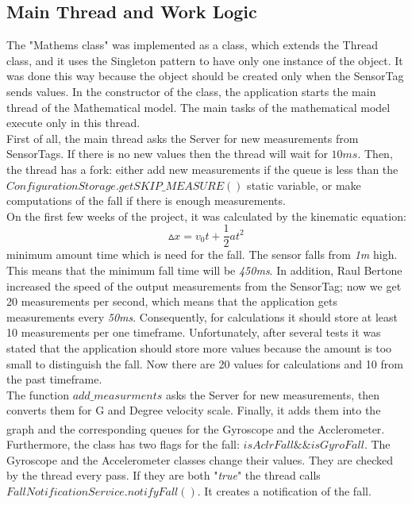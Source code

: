 \documentclass[hidelinks,conference,12pt]{IEEETran}
\begin{document}
\subsection{Main Thread and Work Logic}
The "Mathems class" was implemented as a class, which extends the Thread class, and it uses the Singleton pattern to have only one instance of the object. It was done this way because the object should be created only when the SensorTag sends values. In the constructor of the class, the application starts the main thread of the Mathematical model. The main tasks of the mathematical model execute only in this thread.\\
First of all, the main thread asks the Server for new measurements from SensorTags. If there is no new values then the thread will wait for $10ms$. Then, the thread has a fork: either add new measurements if the queue is less than the $ConfigurationStorage.getSKIP\_MEASURE()$ static variable, or make computations of the fall if there is enough measurements.\\
On the first few weeks of the project, it was calculated by the kinematic equation:
$$ \vartriangle x = v_0t + \frac{1}{2}at^2 $$
minimum amount time which is need for the fall. The sensor falls from \textit{1m} high. This means that the minimum fall time will be \textit{450ms}. In addition, Raul Bertone increased the speed of the output measurements from the SensorTag; now we get 20 measurements per second, which means that the application gets measurements every \textit{50ms}. Consequently, for calculations it should store at least 10 measurements per one timeframe. Unfortunately, after several tests it was stated that the application should store more values because the amount is too small to distinguish the fall. Now there are 20 values for calculations and 10 from the past timeframe.\\
The function $add\_measurments$ asks the Server for new measurements, then converts them for G and Degree velocity scale. Finally, it adds them into the graph and the corresponding queues for the Gyroscope and the Acclerometer\textsuperscript{\cite{movsens}}.\\
Furthermore, the class has two flags for the fall: $isAclrFall \&\& isGyroFall$. The Gyroscope and the Accelerometer classes change their values. They are checked by the thread every pass. If they are both "\textit{true}" the thread calls $FallNotificationService.notifyFall()$. It creates a notification of the fall.
\end{document}
